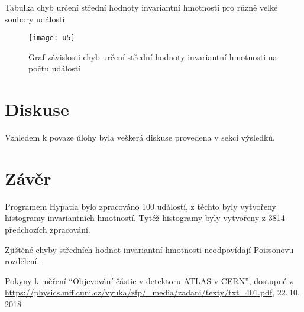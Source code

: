 \documentclass{protokol}
\begin{document}
      \begin{table}[H]
        \centering
        \setlength{\tabcolsep}{10pt}
        
        \caption{Tabulka chyb určení střední hodnoty invariantní hmotnosti pro různě velké soubory událostí}
        \label{tab:u4}
      \end{table}

      \begin{figure}[H]
        \centering
        \texttt{[image: u5]}
        \vspace{-15pt} 
        \caption{Graf závislosti chyb určení střední hodnoty invariantní hmotnosti na počtu událostí}
        \label{fig:u5}
      \end{figure}

  \section*{Diskuse}

    Vzhledem k povaze úlohy byla veškerá diskuse provedena v sekci výsledků.


  \section*{Závěr}

    Programem Hypatia bylo zpracováno 100 událostí, z těchto byly vytvořeny histogramy invariantních hmotností. Tytéž histogramy byly vytvořeny z 3814 předchozích zpracování.

    Zjištěné chyby středních hodnot invariantní hmotnosti neodpovídají Poissonovu rozdělení.


  \begin{thebibliography}{}
 
    Pokyny k měření ``Objevování částic v detektoru ATLAS v
    CERN'', dostupné z\\ \url{https://physics.mff.cuni.cz/vyuka/zfp/_media/zadani/texty/txt_401.pdf}, 22.\,10.\,2018
   
  \end{thebibliography}
\end{document}

